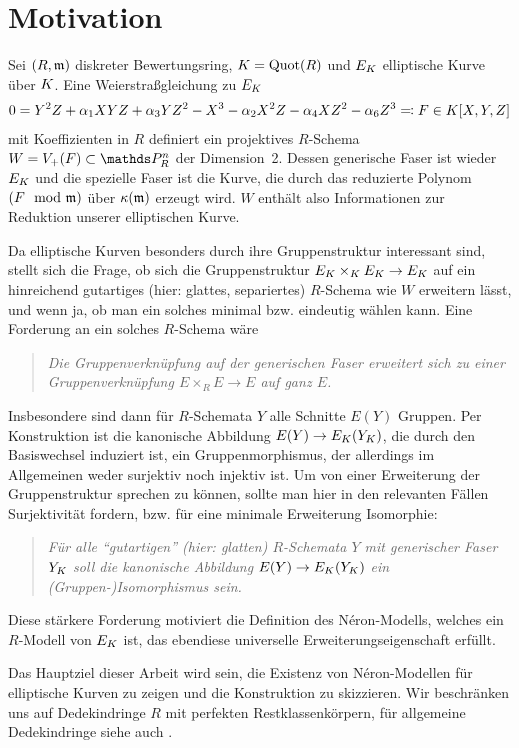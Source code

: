 \chapter{Motivation}

Sei $(R,\mathfrak{m})$ diskreter Bewertungsring, $K=\operatorname{Quot}(R)$ und $E_{K}$
elliptische Kurve über $K$. Eine Weierstraßgleichung zu $E_{K}$
\begin{gather*}
  0 = Y^2 Z + \alpha_1 XYZ + \alpha_3 YZ^2 - X^3 - \alpha_2X^2 Z - \alpha_4 XZ^2 - \alpha_6 Z^3
  \eqqcolon F\in K[X,Y,Z]  
\end{gather*}
mit Koeffizienten in $R$ definiert ein projektives $R$-Schema
$W=V_+(F)\subset\P_R^n$ der Dimension~2. Dessen generische Faser
ist wieder $E_{K}$ und die spezielle Faser ist die Kurve, die durch das
reduzierte Polynom $(F\mod{\mathfrak{m}})$ über $\kappa(\mathfrak{m})$ erzeugt wird.
$W$ enthält also Informationen zur Reduktion unserer elliptischen
Kurve.

Da elliptische Kurven besonders durch ihre Gruppenstruktur
interessant sind, stellt sich die Frage, ob sich die
Gruppenstruktur $E_{K}\times_{K} E_{K}\to E_{K}$ auf ein hinreichend
gutartiges (hier: glattes, separiertes) $R$-Schema wie $W$ erweitern
lässt, und wenn ja, ob man ein solches minimal bzw. eindeutig wählen
kann.
Eine Forderung an ein solches $R$-Schema wäre
\begin{quote}
  \itshape
  Die Gruppenverknüpfung auf der generischen Faser erweitert sich zu
  einer Gruppenverknüpfung $E\times_R E\to E$ auf ganz $E$.
\end{quote}
Insbesondere sind dann für $R$-Schemata $Y$ alle Schnitte $E(Y)$
Gruppen. Per Konstruktion ist die kanonische Abbildung
$E(Y)\to E_{K}(Y_{K})$, die durch den Basiswechsel induziert ist, ein
Gruppenmorphismus, der allerdings im Allgemeinen weder surjektiv noch
injektiv ist. Um von einer Erweiterung der Gruppenstruktur sprechen zu
können, sollte man hier in den relevanten Fällen Surjektivität
fordern, bzw. für eine minimale Erweiterung Isomorphie:
\begin{quote}
  \itshape
  Für alle \enquote{gutartigen} (hier: glatten) $R$-Schemata $Y$ mit
  generischer Faser $Y_{K}$ soll die kanonische Abbildung
  $E(Y)\to E_{K}(Y_{K})$ ein (Gruppen-)Isomorphismus sein.
\end{quote}
Diese stärkere Forderung motiviert die Definition des
Néron-Modells, welches ein $R$-Modell von $E_{K}$ ist, das ebendiese
universelle Erweiterungseigenschaft erfüllt.

Das Hauptziel dieser Arbeit wird sein, die Existenz von Néron-Modellen
für elliptische Kurven zu zeigen und die Konstruktion zu skizzieren.
Wir beschränken uns auf Dedekindringe $R$ mit perfekten
Restklassenkörpern, für allgemeine Dedekindringe siehe auch
\cite{nonperfect}.

